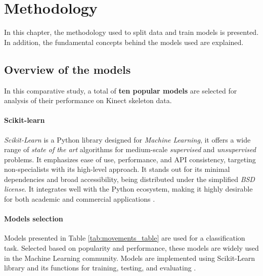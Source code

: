 \hypersetup{colorlinks=true, linkcolor=blue, citecolor=red}

\chapter{Methodology} \label{chap:methodology}

    In this chapter, the methodology used to split data and train models is presented. In addition, the fundamental concepts behind the models used are explained.

    \section{Overview of the models}

        In this comparative study, a total of \textbf{ten popular models} are selected for analysis of their performance on Kinect skeleton data.

        \subsubsection{Scikit-learn}  

            \textit{Scikit-Learn} is a Python library designed for \textit{Machine Learning}, it offers a wide range of \textit{state of the art} algorithms for medium-scale \textit{supervised} and \textit{unsupervised} problems. It emphasizes ease of use, performance, and API consistency, targeting non-specialists with its high-level approach. It stands out for its minimal dependencies and broad accessibility, being distributed under the simplified \textit{BSD license}. It integrates well with the Python ecosystem, making it highly desirable for both academic and commercial applications \cite{scikit-learn}.

        \subsubsection{Models selection}

        Models presented in Table \ref{tab:movements_table} are used for a classification task. Selected based on popularity and performance, these models are widely used in the Machine Learning community. Models are implemented using Scikit-Learn library and its functions for training, testing, and evaluating \cite{sklearn_api}. 

        \newpage 

